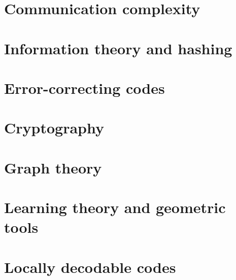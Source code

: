 \part{Communication complexity}






\part{Information theory and hashing}


\part{Error-correcting codes}




\part{Cryptography}



\part{Graph theory}







\part{Learning theory and geometric tools}




\part{Locally decodable codes}


